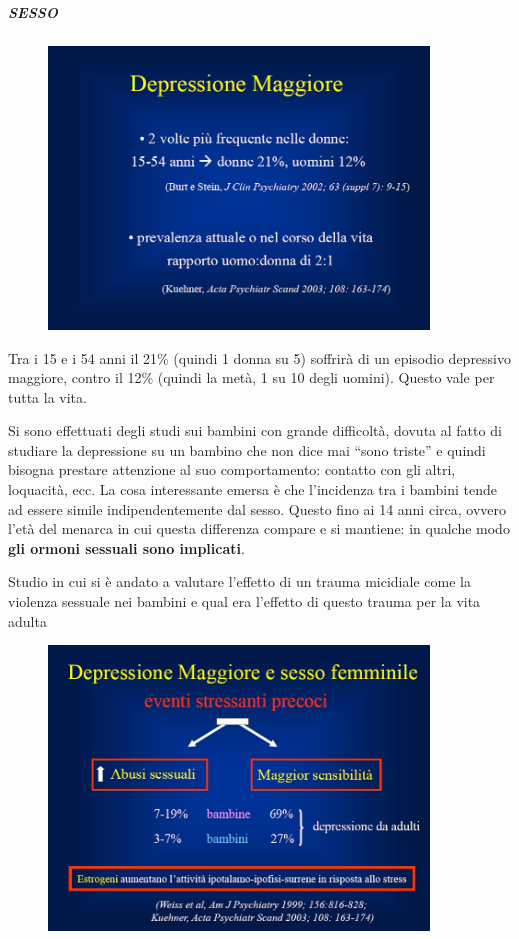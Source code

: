\subparagraph{SESSO}

\begin{figure}[!ht]
\centering
	\includegraphics[width=0.9\textwidth]{02/image4.jpeg}
\end{figure}

Tra i 15 e i 54 anni il 21\% (quindi 1 donna su 5) soffrirà di un
episodio depressivo maggiore, contro il 12\% (quindi la metà, 1 su 10
degli uomini). Questo vale per tutta la vita.

Si sono effettuati degli studi sui bambini con grande difficoltà, dovuta
al fatto di studiare la depressione su un bambino che non dice mai
``sono triste'' e quindi bisogna prestare attenzione al suo
comportamento: contatto con gli altri, loquacità, ecc. La cosa
interessante emersa è che l'incidenza tra i bambini tende ad essere
simile indipendentemente dal sesso. Questo fino ai 14 anni circa, ovvero
l'età del menarca in cui questa differenza compare e si mantiene: in
qualche modo \textbf{gli ormoni sessuali sono implicati}.

Studio in cui si è andato a valutare l'effetto di un trauma micidiale
come la violenza sessuale nei bambini e qual era l'effetto di questo
trauma per la vita adulta

\begin{figure}[!ht]
\centering
	\includegraphics[width=0.9\textwidth]{02/image5.jpeg}
\end{figure}

